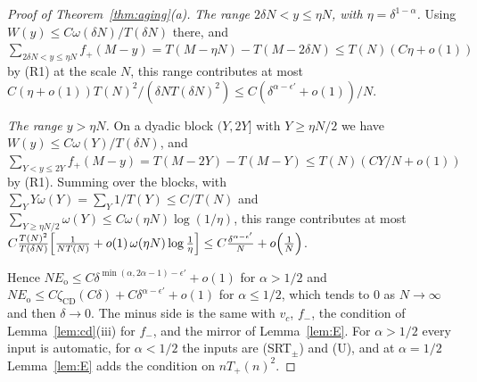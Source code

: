 \begin{proof}[Proof of Theorem~\ref{thm:aging}(a)]
\emph{The range $2\delta N<y\le\eta N$, with $\eta=\delta^{1-\alpha}$.} Using $W(y)\le C\omega(\delta N)/T(\delta N)$
there, and $\sum_{2\delta N<y\le\eta N}f_\plus(M-y)=T(M-\eta N)-T(M-2\delta N)\le T(N)(C\eta+o(1))$ by
(R1) at the scale $N$, this range contributes at most
$C(\eta+o(1))T(N)^2/(\delta NT(\delta N)^2)\le C(\delta^{\alpha-\epsilon'}+o(1))/N$.

\emph{The range $y>\eta N$.} On a dyadic block $(Y,2Y]$ with $Y\ge\eta N/2$ we have
$W(y)\le C\omega(Y)/T(\delta N)$, and $\sum_{Y<y\le2Y}f_\plus(M-y)=T(M-2Y)-T(M-Y)\le T(N)(CY/N+o(1))$ by
(R1). Summing over the blocks, with $\sum_YY\omega(Y)=\sum_Y1/T(Y)\le C/T(N)$ and
$\sum_{Y\ge\eta N/2}\omega(Y)\le C\omega(\eta N)\log(1/\eta)$, this range contributes at most
$C\frac{T(N)^2}{T(\delta N)}\Bigl[\frac1{NT(N)}+o(1)\,\omega(\eta N)\log\frac1\eta\Bigr]\le C\frac{\delta^{\alpha-\epsilon'}}N+o\Bigl(\frac1N\Bigr)$.

Hence $NE_{\mathrm o}\le C\delta^{\min(\alpha,2\alpha-1)-\epsilon'}+o(1)$ for $\alpha>1/2$ and
$NE_{\mathrm o}\le C\zeta_{\mathrm{CD}}(C\delta)+C\delta^{\alpha-\epsilon'}+o(1)$ for $\alpha\le1/2$, which
tends to $0$ as $N\to\infty$ and then $\delta\to0$. The minus side is the same with $v_c$, $f_\minus$,
the condition of Lemma~\ref{lem:cd}(iii) for $f_\minus$, and the mirror of Lemma~\ref{lem:E}.
For $\alpha>1/2$ every input is automatic, for $\alpha<1/2$ the inputs are (SRT$_\pm$) and (U),
and at $\alpha=1/2$ Lemma~\ref{lem:E} adds the condition on $nT_\plus(n)^2$.
\end{proof}


